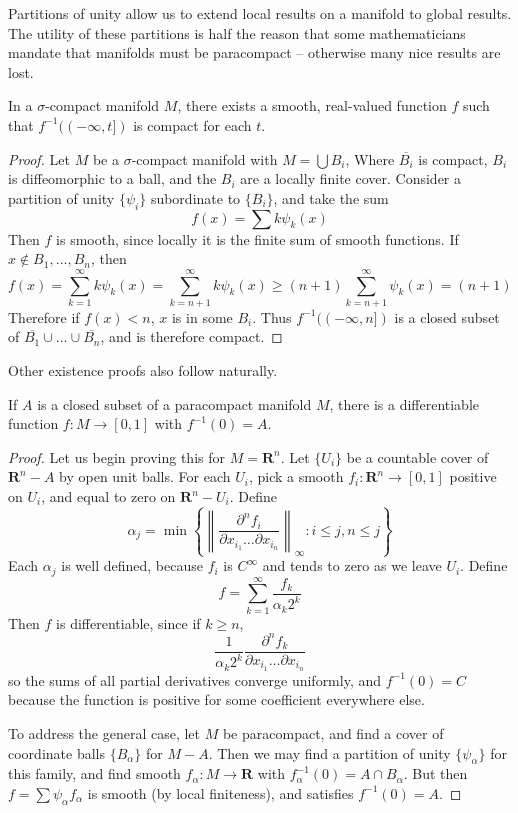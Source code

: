 Partitions of unity allow us to extend local results on a manifold to global results. The utility of these partitions is half the reason that some mathematicians mandate that manifolds must be paracompact -- otherwise many nice results are lost.

\begin{theorem}
    In a $\sigma$-compact manifold $M$, there exists a smooth, real-valued function $f$ such that $f^{-1}((-\infty, t])$ is compact for each $t$.
\end{theorem}
\begin{proof}
    Let $M$ be a $\sigma$-compact manifold with $M = \bigcup B_i$, Where $\overline{B_i}$ is compact, $B_i$ is diffeomorphic to a ball, and the $B_i$ are a locally finite cover. Consider a partition of unity $\{\psi_i\}$ subordinate to $\{B_i\}$, and take the sum
    \[ f(x) = \sum k \psi_k(x) \]
    Then $f$ is smooth, since locally it is the finite sum of smooth functions. If $x \not \in B_1, \dots, B_n$, then
    \[ f(x) = \sum_{k = 1}^\infty k \psi_k(x) = \sum_{k = n+1}^\infty k \psi_k(x) \geq (n+1) \sum_{k = n+1}^\infty \psi_k(x) = (n+1) \]
    Therefore if $f(x) < n$, $x$ is in some $B_i$. Thus $f^{-1}((-\infty, n])$ is a closed subset of $\overline{B_1} \cup \dots \cup \overline{B_n}$, and is therefore compact.
\end{proof}

Other existence proofs also follow naturally.

\begin{lemma}
    If $A$ is a closed subset of a paracompact manifold $M$, there is a differentiable function $f: M \to [0,1]$ with $f^{-1}(0) = A$.
\end{lemma}
\begin{proof}
    Let us begin proving this for $M = \mathbf{R}^n$. Let $\{ U_i \}$ be a countable cover of $\mathbf{R}^n - A$ by open unit balls. For each $U_i$, pick a smooth $f_i : \mathbf{R}^n \to [0,1]$ positive on $U_i$, and equal to zero on $\mathbf{R}^n - U_i$. Define
    \[ \alpha_j = \min \left\{ \left\| \frac{\partial^n f_i}{\partial x_{i_1} \dots \partial x_{i_n}} \right\|_\infty : i \leq j, n \leq j \right\} \]
    Each $\alpha_j$ is well defined, because $f_i$ is $C^\infty$ and tends to zero as we leave $U_i$. Define
    \[ f = \sum_{k = 1}^\infty \frac{f_k}{\alpha_k 2^k} \]
    Then $f$ is differentiable, since if $k \geq n$,
    \[ \frac{1}{\alpha_k 2^k} \frac{\partial^n f_k}{\partial x_{i_1} \dots \partial x_{i_n}} \]
    so the sums of all partial derivatives converge uniformly, and $f^{-1}(0) = C$ because the function is positive for some coefficient everywhere else.

    To address the general case, let $M$ be paracompact, and find a cover of coordinate balls $\{ B_\alpha \}$ for $M - A$. Then we may find a partition of unity $\{ \psi_\alpha \}$ for this family, and find smooth $f_\alpha: M \to \mathbf{R}$ with $f_\alpha^{-1}(0) = A \cap B_\alpha$. But then $f = \sum \psi_\alpha f_\alpha$ is smooth (by local finiteness), and satisfies $f^{-1}(0) = A$.
\end{proof}


